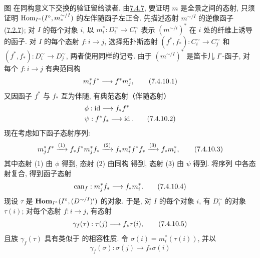 图  在同构意义下交换的验证留给读者.
由\hyperref[VI.prop7.4.7]{7.4.7},
要证明 $m$ 是全景之间的态射,
只须证明 $\operatorname{Hom}_{I^{\circ}}(I^{\circ},m^{\sim/I}_{\ast})$ 的左伴随函子左正合.
先描述态射 $m^{\sim/I}$ 的逆像函子 (\hyperref[VI.prop7.2.7]{7.2.7});
对 $I$ 的每个对象 $i$, 以 $m^{\ast}_i:D^{\sim}_i\to C^{\sim}_i$
表示 $(m^{\sim/i})^{\ast}$ 在 $i$ 处的纤维上诱导的函子.
对 $I$ 的每个态射 $f:i\to j$, 选择拓扑斯态射
$(f^{\ast},f_{\ast}):C^{\sim}_i\to C^{\sim}_j$ 和
$(f^{\ast},f_{\ast}):D^{\sim}_i\to D^{\sim}_j$, 两者使用同样的记号.
由于 $(m^{\sim/I})^{\ast}$ 是笛卡儿 $I^{\circ}$-函子,
对每个 $f:i\to j$ 有典范同构
\begin{equation*}
m^{\ast}_i f^{\ast} \to f^{\ast} m^{\ast}_j{\quoi},\tag{7.4.10.1}
\end{equation*}
又因函子 $f^{\ast}$ 与 $f_{\ast}$ 互为伴随, 有典范态射（伴随态射）
\begin{align*}
& \phi : \id \to f_{\ast} f^{\ast}\\
& \psi : f^{\ast} f_{\ast} \to \id{\quoi}. \tag{7.4.10.2}
\end{align*}
现在考虑如下函子态射序列:
\begin{equation*}
m^{\ast}_j f^{\ast} \xrightarrow{(1)} f_{\ast} f^{\ast} m^{\ast}_j
f_{\ast} \xrightarrow{(2)} f_{\ast} m^{\ast}_i f^{\ast} f_{\ast}
\xrightarrow{(3)} f_{\ast} m^{\ast}_i{},\tag{7.4.10.3}
\end{equation*}
其中态射 (1) 由 $\phi$ 得到, 态射 (2) 由同构
 得到, 态射 (3) 由 $\psi$ 得到.
将序列\pageoriginale {} 中各态射复合,
得到函子态射
\begin{equation*}
\can_f : m^{\ast}_j f_{\ast} \to f_{\ast} m^{\ast}_i{\quoi}.\tag{7.4.10.4}
\end{equation*}
现设 $\tau$ 是 $\operatorname{\mathbf{Hom}}_{I^{\circ}}(I^{\circ},(D^{\sim/I})')$ 的对象.
于是, 对 $I$ 的每个对象 $i$, 有 $D^{\sim}_i$ 的对象 $\tau(i)$;
对每个态射 $f:i\to j$, 有态射
\begin{equation*}
\gamma_{f} (\tau) : \tau(j) \to f_{\ast} \tau(i){\quoi},\tag{7.4.10.5}
\end{equation*}
且族 $\gamma_f(\tau)$ 具有类似于 的相容性质.
令 $\sigma(i)=m^{\ast}_i(\tau(i))$, 并以
\begin{equation*}
\gamma_{f} (\sigma) : \sigma(j) \to f_{\ast} \sigma(i)\tag{7.4.10.6}
\end{equation*}
